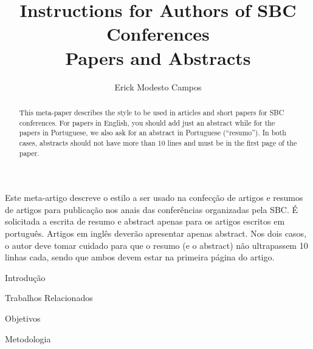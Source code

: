 \documentclass[12pt]{article}
\title{Instructions for Authors of SBC Conferences\\ Papers and Abstracts}
\author{Erick Modesto Campos}
\begin{document}
 

\onehalfspace
\maketitle

\begin{abstract}
  This meta-paper describes the style to be used in articles and short papers
  for SBC conferences. For papers in English, you should add just an abstract
  while for the papers in Portuguese, we also ask for an abstract in
  Portuguese (``resumo''). In both cases, abstracts should not have more than
  10 lines and must be in the first page of the paper.
\end{abstract}
     
\begin{resumo} 
  Este meta-artigo descreve o estilo a ser usado na confecção de artigos e
  resumos de artigos para publicação nos anais das conferências organizadas
  pela SBC. É solicitada a escrita de resumo e abstract apenas para os artigos
  escritos em português. Artigos em inglês deverão apresentar apenas abstract.
  Nos dois casos, o autor deve tomar cuidado para que o resumo (e o abstract)
  não ultrapassem 10 linhas cada, sendo que ambos devem estar na primeira
  página do artigo.
\end{resumo}

\begin{section}{Introdução}

\end{section}
\begin{section}{Trabalhos Relacionados}

\end{section}
\begin{section}{Objetivos}

\end{section}
\begin{section}{Metodologia}

\end{section}



\end{document}
